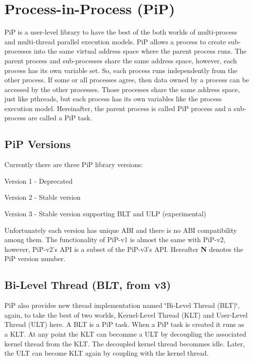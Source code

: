 \section*{Process-\/in-\/\-Process (Pi\-P)}

Pi\-P is a user-\/level library to have the best of the both worlds of multi-\/process and multi-\/thread parallel execution models. Pi\-P allows a process to create sub-\/processes into the same virtual address space where the parent process runs. The parent process and sub-\/processes share the same address space, however, each process has its own variable set. So, each process runs independently from the other process. If some or all processes agree, then data owned by a process can be accessed by the other processes. Those processes share the same address space, just like pthreads, but each process has its own variables like the process execution model. Hereinafter, the parent process is called Pi\-P process and a sub-\/process are called a Pi\-P task.

\subsection*{Pi\-P Versions}

Currently there are three Pi\-P library versions\-:


\begin{DoxyItemize}
\item Version 1 -\/ Deprecated
\item Version 2 -\/ Stable version
\item Version 3 -\/ Stable version supporting B\-L\-T and U\-L\-P (experimental)
\end{DoxyItemize}

Unfortunately each version has unique A\-B\-I and there is no A\-B\-I compatibility among them. The functionality of Pi\-P-\/v1 is almost the same with Pi\-P-\/v2, however, Pi\-P-\/v2's A\-P\-I is a subset of the Pi\-P-\/v3's A\-P\-I. Hereafter {\bfseries N} denotes the Pi\-P version number.

\subsection*{Bi-\/\-Level Thread (B\-L\-T, from v3)}

Pi\-P also provides new thread implementation named \char`\"{}\-Bi-\/\-Level Thread
(\-B\-L\-T)\char`\"{}, again, to take the best of two worlds, Kernel-\/\-Level Thread (K\-L\-T) and User-\/\-Level Thread (U\-L\-T) here. A B\-L\-T is a Pi\-P task. When a Pi\-P task is created it runs as a K\-L\-T. At any point the K\-L\-T can becomme a U\-L\-T by decoupling the associated kernel thread from the K\-L\-T. The decoupled kernel thread becommes idle. Later, the U\-L\-T can become K\-L\-T again by coupling with the kernel thread.

